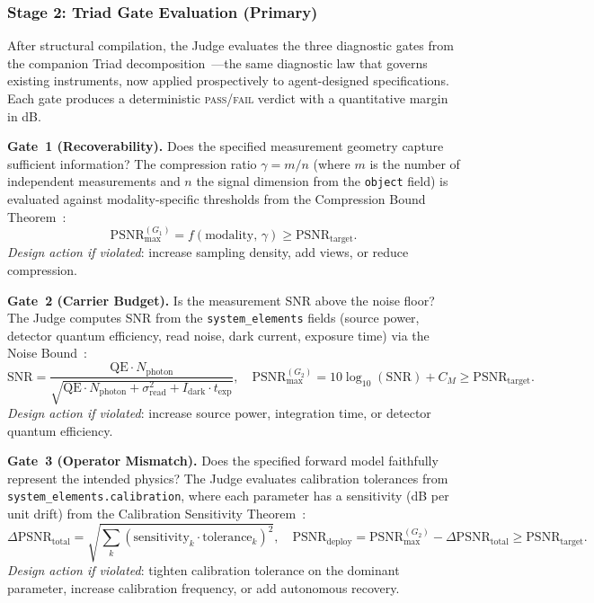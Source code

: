 \documentclass[11pt,a4paper]{article}
\begin{document}
\subsubsection{Stage 2: Triad Gate Evaluation (Primary)}

After structural compilation, the Judge evaluates the three diagnostic gates from the companion Triad decomposition~\cite{paperII}---the same diagnostic law that governs existing instruments, now applied prospectively to agent-designed specifications.  Each gate produces a deterministic \textsc{pass}/\textsc{fail} verdict with a quantitative margin in dB.

\textbf{Gate~1 (Recoverability).}  Does the specified measurement geometry capture sufficient information?  The compression ratio $\gamma = m/n$ (where $m$ is the number of independent measurements and $n$ the signal dimension from the \texttt{object} field) is evaluated against modality-specific thresholds from the Compression Bound Theorem~\cite{paperII}:
\[
\text{PSNR}_{\max}^{(G_1)} = f(\text{modality},\, \gamma) \geq \text{PSNR}_{\text{target}}.
\]
\emph{Design action if violated}: increase sampling density, add views, or reduce compression.

\textbf{Gate~2 (Carrier Budget).}  Is the measurement SNR above the noise floor?  The Judge computes SNR from the \texttt{system\_elements} fields (source power, detector quantum efficiency, read noise, dark current, exposure time) via the Noise Bound~\cite{paperII}:
\[
\text{SNR} = \frac{\text{QE} \cdot N_{\text{photon}}}{\sqrt{\text{QE} \cdot N_{\text{photon}} + \sigma_{\text{read}}^2 + I_{\text{dark}} \cdot t_{\text{exp}}}}, \quad
\text{PSNR}_{\max}^{(G_2)} = 10\log_{10}(\text{SNR}) + C_M \geq \text{PSNR}_{\text{target}}.
\]
\emph{Design action if violated}: increase source power, integration time, or detector quantum efficiency.

\textbf{Gate~3 (Operator Mismatch).}  Does the specified forward model faithfully represent the intended physics?  The Judge evaluates calibration tolerances from \texttt{system\_elements.calibration}, where each parameter has a sensitivity (dB per unit drift) from the Calibration Sensitivity Theorem~\cite{paperII}:
\[
\Delta\text{PSNR}_{\text{total}} = \sqrt{\sum_{k} (\text{sensitivity}_k \cdot \text{tolerance}_k)^2}, \quad
\text{PSNR}_{\text{deploy}} = \text{PSNR}_{\max}^{(G_2)} - \Delta\text{PSNR}_{\text{total}} \geq \text{PSNR}_{\text{target}}.
\]
\emph{Design action if violated}: tighten calibration tolerance on the dominant parameter, increase calibration frequency, or add autonomous recovery.
\end{document}
